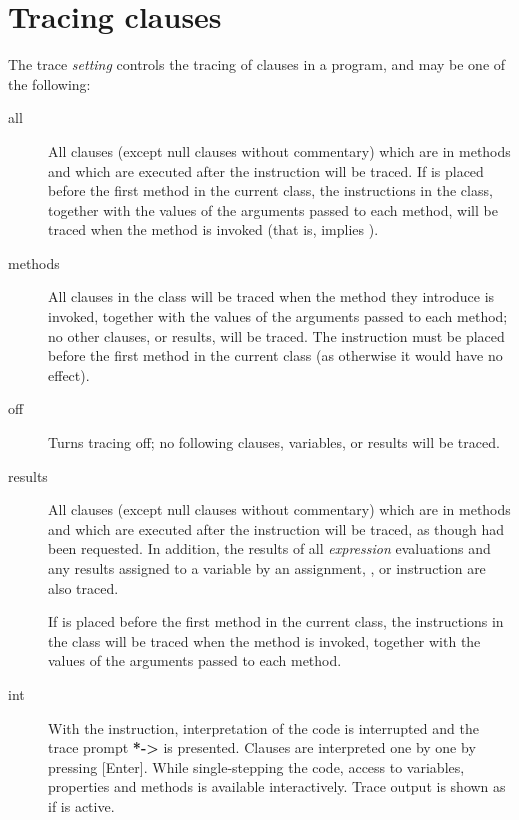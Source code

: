 \section{Tracing clauses}
 
The trace \emph{setting} controls the tracing of clauses in a program, and
may be one of the following:
\begin{description}
\item[all]\label{reftrall}
 All clauses (except null clauses without commentary) which are in
methods and which are executed after the  instruction will
be traced.
If  is placed before the first method in the current
class, the  instructions in the class,
together with the values of the arguments passed to each method,
will be traced when the method is invoked (that is, 
implies ).
\item[methods]\label{reftrmeth}
 
All  clauses in the class will be traced when the method
they introduce is invoked, together with the values of the arguments
passed to each method; no other clauses, or results, will be traced.
The  instruction must be placed before the first
method in the current class (as otherwise it would have no effect).
\item[off]\label{reftroff}
 
Turns tracing off; no following clauses, variables, or results will be traced.
\item[results]\label{reftrres}
 All clauses (except null clauses without commentary) which are in
methods and which are executed after the  instruction will
be traced, as though  had been requested.
In addition, the results of all \emph{expression} evaluations and
any results assigned to a variable by an assignment, , or
 instruction are also traced.
 
If  is placed before the first method in the
current class, the  instructions in the class will be
traced when the method is invoked, together with the values of the
arguments passed to each method.
\item[int]\label{reftrres}

With the  instruction, interpretation of the
code is interrupted and the trace prompt \textbf{*->} is presented. Clauses are 
interpreted one by one by pressing [Enter]. While single-stepping the code, access 
to variables, properties and methods is available interactively. 
Trace output is shown as if  is active.

\end{description}
